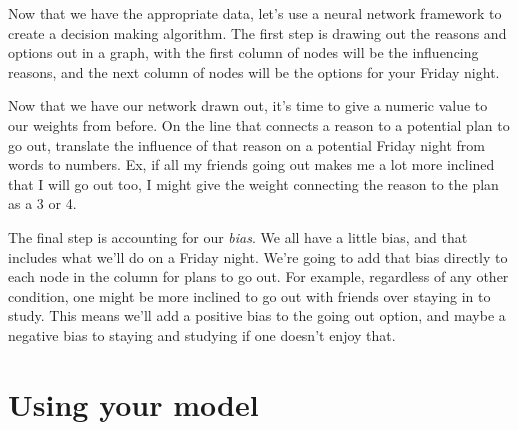 \documentclass[11pt]{article}
\begin{document}
Now that we have the appropriate data, let's use a neural network framework to create a decision making algorithm. The
first step is drawing out the reasons and options out in a graph, with the first column of nodes will be the influencing
reasons, and the next column of nodes will be the options for your Friday night.


\begin{figure}[h]
  \centering
\end{figure}

Now that we have our network drawn out, it's time to give a numeric value to our weights from before. On the line that
connects a reason to a potential plan to go out, translate the influence of that reason on a potential Friday night from
words to numbers. Ex, if all my friends going out makes me a lot more inclined that I will go out too, I might give the
weight connecting the reason to the plan as a 3 or 4.

The final step is accounting for our \emph{bias}. We all have a little bias, and that includes what we'll do on a Friday
night. We're going to add that bias directly to each node in the column for plans to go out. For example, regardless of
any other condition, one might be more inclined to go out with friends over staying in to study. This means we'll add a
positive bias to the going out option, and maybe a negative bias to staying and studying if one doesn't enjoy that.

\section*{Using your model}
\end{document}
